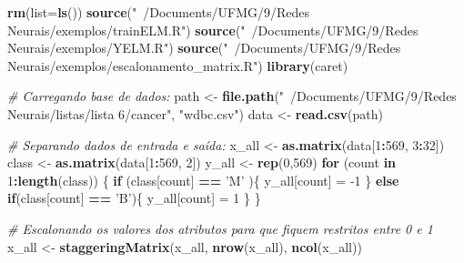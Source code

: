 \documentclass[
]{article}
\newenvironment{Shaded}{\begin{snugshade}}{\end{snugshade}}
\newcommand{\CommentTok}[1]{\textcolor[rgb]{0.56,0.35,0.01}{\textit{#1}}}
\newcommand{\ControlFlowTok}[1]{\textcolor[rgb]{0.13,0.29,0.53}{\textbf{#1}}}
\newcommand{\DataTypeTok}[1]{\textcolor[rgb]{0.13,0.29,0.53}{#1}}
\newcommand{\DecValTok}[1]{\textcolor[rgb]{0.00,0.00,0.81}{#1}}
\newcommand{\KeywordTok}[1]{\textcolor[rgb]{0.13,0.29,0.53}{\textbf{#1}}}
\newcommand{\NormalTok}[1]{#1}
\newcommand{\OperatorTok}[1]{\textcolor[rgb]{0.81,0.36,0.00}{\textbf{#1}}}
\newcommand{\StringTok}[1]{\textcolor[rgb]{0.31,0.60,0.02}{#1}}
\begin{document}
\begin{Shaded}
\begin{Highlighting}[]
\KeywordTok{rm}\NormalTok{(}\DataTypeTok{list=}\KeywordTok{ls}\NormalTok{())}
\KeywordTok{source}\NormalTok{(}\StringTok{"~/Documents/UFMG/9/Redes Neurais/exemplos/trainELM.R"}\NormalTok{)}
\KeywordTok{source}\NormalTok{(}\StringTok{"~/Documents/UFMG/9/Redes Neurais/exemplos/YELM.R"}\NormalTok{)}
\KeywordTok{source}\NormalTok{(}\StringTok{"~/Documents/UFMG/9/Redes Neurais/exemplos/escalonamento_matrix.R"}\NormalTok{)}
\KeywordTok{library}\NormalTok{(caret)}

\CommentTok{# Carregando base de dados:}
\NormalTok{path <-}\StringTok{ }\KeywordTok{file.path}\NormalTok{(}\StringTok{"~/Documents/UFMG/9/Redes Neurais/listas/lista 6/cancer"}\NormalTok{, }\StringTok{"wdbc.csv"}\NormalTok{)}
\NormalTok{data <-}\StringTok{ }\KeywordTok{read.csv}\NormalTok{(path)}

\CommentTok{# Separando dados de entrada e saída:}
\NormalTok{x_all <-}\StringTok{ }\KeywordTok{as.matrix}\NormalTok{(data[}\DecValTok{1}\OperatorTok{:}\DecValTok{569}\NormalTok{, }\DecValTok{3}\OperatorTok{:}\DecValTok{32}\NormalTok{])}
\NormalTok{class <-}\StringTok{ }\KeywordTok{as.matrix}\NormalTok{(data[}\DecValTok{1}\OperatorTok{:}\DecValTok{569}\NormalTok{, }\DecValTok{2}\NormalTok{])}
\NormalTok{y_all <-}\StringTok{ }\KeywordTok{rep}\NormalTok{(}\DecValTok{0}\NormalTok{,}\DecValTok{569}\NormalTok{)}
\ControlFlowTok{for}\NormalTok{ (count }\ControlFlowTok{in} \DecValTok{1}\OperatorTok{:}\KeywordTok{length}\NormalTok{(class)) \{}
  \ControlFlowTok{if}\NormalTok{ (class[count] }\OperatorTok{==}\StringTok{ 'M'}\NormalTok{ )\{}
\NormalTok{    y_all[count] =}\StringTok{ }\DecValTok{-1}
\NormalTok{  \}}
  \ControlFlowTok{else} \ControlFlowTok{if}\NormalTok{(class[count] }\OperatorTok{==}\StringTok{ 'B'}\NormalTok{)\{}
\NormalTok{    y_all[count] =}\StringTok{ }\DecValTok{1}
\NormalTok{  \}}
\NormalTok{\}}

\CommentTok{# Escalonando os valores dos atributos para que fiquem restritos entre 0 e 1}
\NormalTok{x_all <-}\StringTok{ }\KeywordTok{staggeringMatrix}\NormalTok{(x_all, }\KeywordTok{nrow}\NormalTok{(x_all), }\KeywordTok{ncol}\NormalTok{(x_all))}


\end{Highlighting}
\end{Shaded}
\end{document}
